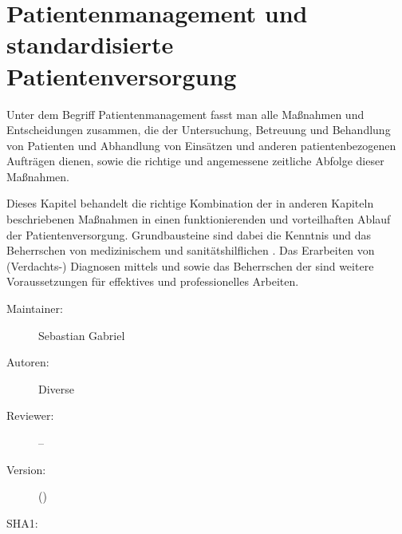 \def\ChapterCode{PAM}
	\chapter
[\CO{[PAM]} Patientenmanagement und standardisierte Patientenversorgung]
{Patientenmanagement und standardisierte Patientenversorgung}
\label{chp:PAM}

\ChapterIntro
{%
Unter dem Begriff Patientenmanagement fasst man alle
Maßnahmen und Entscheidungen zusammen, die der Untersuchung,
Betreuung und Behandlung von Patienten und Abhandlung von
Einsätzen und anderen patientenbezogenen Aufträgen dienen,
sowie die richtige und angemessene zeitliche Abfolge dieser
Maßnahmen.

Dieses Kapitel behandelt die richtige Kombination der in
anderen Kapiteln beschriebenen Maßnahmen in einen
funktionierenden und vorteilhaften Ablauf der
Patientenversorgung. Grundbausteine sind dabei die Kenntnis
und das Beherrschen von medizinischem  und
sanitätshilflichen . Das Erarbeiten von
(Verdachts-) Diagnosen mittels  und
 sowie das Beherrschen der
 sind weitere
Voraussetzungen für effektives und professionelles Arbeiten.
}
{%
\begin{description}
  \item[Maintainer:] Sebastian Gabriel
  \item[Autoren:] Diverse
  \item[Reviewer:] --
  \item[Version:] {\DocVersion} ({\DocVersionInfo})
  \item[SHA1:] {\DocGitCommit}
\end{description}

{\TxTeilkapitelAASS}}



% 
% 

\clearpage %
% 

